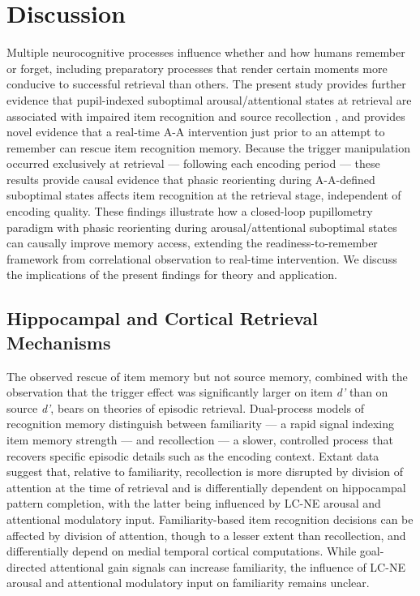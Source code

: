 \section{Discussion}

Multiple neurocognitive processes influence whether and how humans remember or forget, including preparatory processes that render certain moments more conducive to successful retrieval than others. The present study provides further evidence that pupil-indexed suboptimal arousal/attentional states at retrieval are associated with impaired item recognition and source recollection \parencite{robison2022pupillary,madore2022readiness,madore2020memory}, and provides novel evidence that a real-time A-A intervention just prior to an attempt to remember can rescue item recognition memory. Because the trigger manipulation occurred exclusively at retrieval — following each encoding period — these results provide causal evidence that phasic reorienting during A-A-defined suboptimal states affects item recognition at the retrieval stage, independent of encoding quality. These findings illustrate how a closed-loop pupillometry paradigm with phasic reorienting during arousal/attentional suboptimal states can causally improve memory access, extending the readiness-to-remember framework from correlational observation to real-time intervention. We discuss the implications of the present findings for theory and application.

\subsection{Hippocampal and Cortical Retrieval Mechanisms}

The observed rescue of item memory but not source memory, combined with the observation that the trigger effect was significantly larger on item \textit{d'} than on source \textit{d'}, bears on theories of episodic retrieval. Dual-process models of recognition memory distinguish between familiarity — a rapid signal indexing item memory strength — and recollection — a slower, controlled process that recovers specific episodic details such as the encoding context. Extant data suggest that, relative to familiarity, recollection is more disrupted by division of attention at the time of retrieval and is differentially dependent on hippocampal pattern completion, with the latter being influenced by LC-NE arousal and attentional modulatory input. Familiarity-based item recognition decisions can be affected by division of attention, though to a lesser extent than recollection, and differentially depend on medial temporal cortical computations. While goal-directed attentional gain signals can increase familiarity, the influence of LC-NE arousal and attentional modulatory input on familiarity remains unclear.

